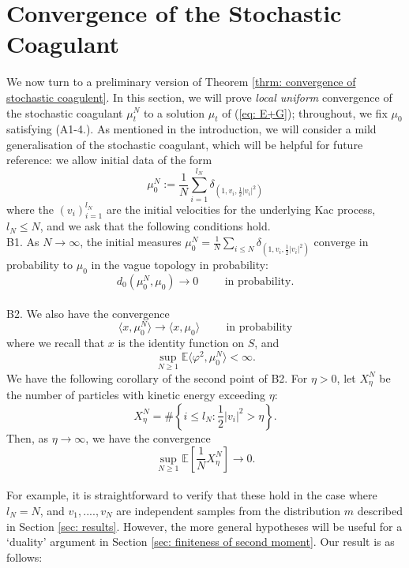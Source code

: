 \documentclass[11pt, notitlepage]{article}
\newcommand{\EE}{\ensuremath{\mathbb{E}}}
\newcommand{\abs}[1]{\left\lvert{#1}\right\rvert}
\begin{document}

\fi


\iffalse \section{\textbf{Convergence of the Stochastic Coagulant}}
\label{sec: csc}

We now turn to a preliminary version of Theorem \ref{thrm: convergence of stochastic coagulent}.
In this section, we will prove \emph{local uniform} convergence of the stochastic coagulant $\mu^N_t$ to a solution $\mu_t$ of (\ref{eq: E+G}); throughout, we fix $\mu_0$ satisfying (A1-4.). As mentioned in the introduction, we will consider a mild generalisation of the stochastic coagulant, which will be helpful for future reference: we allow initial data of the form 
\begin{equation}
    \mu^N_0 := \frac1N \sum_{i=1}^{l_N} \delta_{\left(1,v_i, \frac12 \abs{v_i}^2\right)}
\end{equation}
where the $(v_i)_{i=1}^{l_N}$ are the initial velocities for the underlying Kac process, $l_N\le N$, and we ask that the following conditions hold.
\\B1. As $N\rightarrow \infty$, the initial measures $\mu^N_0=\frac1N\sum_{i\le N}\delta_{(1,v_i,\frac{1}{2}|v_i|^2)}$ converge in probability to $\mu_0$ in the vague topology in probability: \begin{equation}d_0(\mu^N_0, \mu_0)\rightarrow 0 \hspace{1cm}\text{in probability}. \end{equation} 
\\B2. We also have the convergence \begin{equation} \langle x, \mu^N_0\rangle \rightarrow \langle x, \mu_0\rangle \hspace{1cm} \text{in probability}\end{equation} where we recall that $x$ is the identity function on $S$, and \begin{equation} \sup_{N\ge 1} \EE\langle \varphi^2, \mu^N_0\rangle <\infty. \end{equation}
We have the following corollary of the second point of B2. For $\eta>0$, let $X^N_\eta$ be the number of particles with kinetic energy exceeding $\eta:$ \begin{equation}
    X^N_\eta= \#\left\{i\le l_N: \frac{1}{2}|v_i|^2>\eta\right\}.
\end{equation}Then, as $\eta\rightarrow \infty$, we have the convergence \begin{equation}\label{eq: b3} \sup_{N\ge 1} \mathbb{E}\left[\frac{1}{N}X^N_\eta\right]\rightarrow 0. \end{equation} \medskip \\ For example, it is straightforward to verify that these hold in the case where $l_N=N$, and $v_1,....,v_N$ are independent samples from the distribution $m$ described in Section \ref{sec: results}. However, the more general hypotheses will be useful for a `duality' argument in Section \ref{sec: finiteness of second moment}. Our result is as follows:
\end{document}
